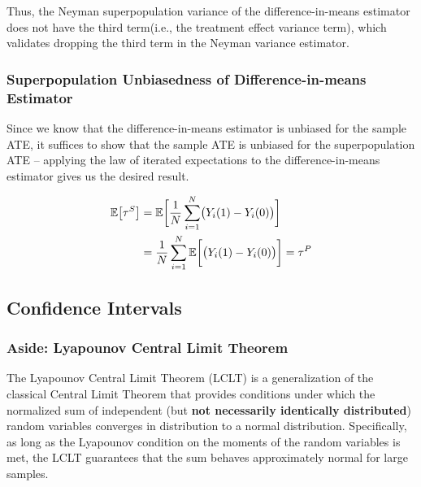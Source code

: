 Thus, the Neyman superpopulation variance of the difference-in-means estimator does not have the third term(i.e., the treatment effect variance term), which validates dropping the third term in the Neyman variance estimator.

\subsubsection{Superpopulation Unbiasedness of Difference-in-means Estimator}

Since we know that the difference-in-means estimator is unbiased for the sample ATE, it suffices to show that the sample ATE is unbiased for the superpopulation ATE –
applying the law of iterated expectations to the difference-in-means estimator gives us the desired result.

\begin{align}
    {\mathbb{E}}\bigl[\tau^S\bigr] &= {\mathbb{E}}\biggl[\frac{1}{N}\sum_{i=1}^N \bigl(Y_i(1) - Y_i(0)\bigr)\biggr]\\
    &= \frac{1}{N} \sum_{i=1}^N {\mathbb{E}}\biggl[\bigl(Y_i(1) - Y_i(0)\bigr)\biggr] = \tau^P
\end{align}

\subsection{Confidence Intervals}

\subsubsection{Aside: Lyapounov Central Limit Theorem}

The Lyapounov Central Limit Theorem (LCLT) is a generalization of the classical Central Limit Theorem that provides conditions under which the normalized sum of independent (but \textbf{not necessarily identically distributed}) random variables converges in distribution to a normal distribution. Specifically, as long as the Lyapounov condition on the moments of the random variables is met, the LCLT guarantees that the sum behaves approximately normal for large samples.



